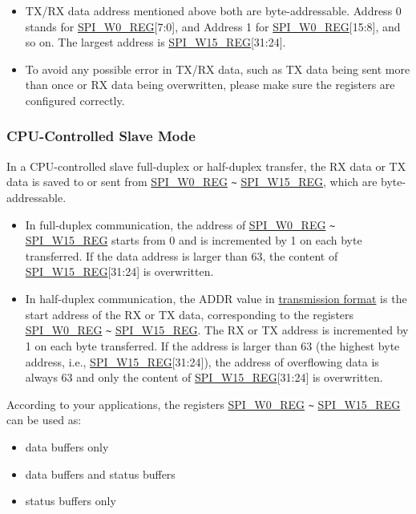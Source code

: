 \documentclass[main\_\_EN.tex]{subfiles}
\begin{document}
\begin{tiplisting}
\vspace{-2em}
\begin{itemize}
    \item TX/RX data address mentioned above both are byte-addressable. Address 0 stands for \hyperref[regdesc:SPIW0REG]{SPI\_W0\_REG}[7:0], and Address 1 for \hyperref[regdesc:SPIW0REG]{SPI\_W0\_REG}[15:8], and so on. The largest address is \hyperref[regdesc:SPIW15REG]{SPI\_W15\_REG}[31:24].
    \item To avoid any possible error in TX/RX data, such as TX data being sent more than once or RX data being overwritten, please make sure the registers are configured correctly.
\end{itemize}
\end{tiplisting}

\subsubsection{CPU-Controlled Slave Mode} \label{GP-SPI slave CPU}

In a CPU-controlled slave full-duplex or half-duplex transfer, the RX data or TX data is saved to or sent from \hyperref[regdesc:SPIW0REG]{SPI\_W0\_REG} \verb+~+ \hyperref[regdesc:SPIW15REG]{SPI\_W15\_REG}, which are byte-addressable.

\begin{itemize}
    \item In full-duplex communication, the address of \hyperref[regdesc:SPIW0REG]{SPI\_W0\_REG} \verb+~+ \hyperref[regdesc:SPIW15REG]{SPI\_W15\_REG} starts from 0 and is incremented by 1 on each byte transferred. If the data address is larger than 63, the content of \hyperref[regdesc:SPIW15REG]{SPI\_W15\_REG}[31:24] is overwritten.
    \item In half-duplex communication, the ADDR value in \hyperref[slave communication format]{transmission format} is the start address of the RX or TX data, corresponding to the registers \hyperref[regdesc:SPIW0REG]{SPI\_W0\_REG} \verb+~+ \hyperref[regdesc:SPIW15REG]{SPI\_W15\_REG}. The RX or TX address is incremented by 1 on each byte transferred. If the address is larger than 63 (the highest byte address, i.e., \hyperref[regdesc:SPIW15REG]{SPI\_W15\_REG}[31:24]), the address of overflowing data is always 63 and only the content of \hyperref[regdesc:SPIW15REG]{SPI\_W15\_REG}[31:24] is overwritten.
\end{itemize}

According to your applications, the registers \hyperref[regdesc:SPIW0REG]{SPI\_W0\_REG} \verb+~+ \hyperref[regdesc:SPIW15REG]{SPI\_W15\_REG} can be used as:
\begin{itemize}
    \item data buffers only
    \item data buffers and status buffers
    \item status buffers only
\end{itemize}
\end{document}
